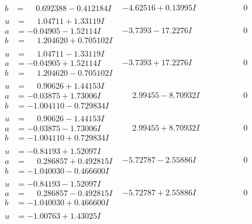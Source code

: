 \documentclass[1p]{elsarticle_modified}
\theoremstyle{definition}
\begin{document}
$$\begin{array}{c|c|c}
\begin{aligned}
b &= \phantom{-}0.692388 - 0.412184 I\end{aligned}
 & -4.62516 + 0.13995 I & \phantom{-0.000000 } 0 \\ \hline\begin{aligned}
u &= \phantom{-}1.04711 + 1.33119 I \\
a &= -0.04905 - 1.52114 I \\
b &= \phantom{-}1.204620 + 0.705102 I\end{aligned}
 & -3.7393 - 17.2276 I & \phantom{-0.000000 } 0 \\ \hline\begin{aligned}
u &= \phantom{-}1.04711 - 1.33119 I \\
a &= -0.04905 + 1.52114 I \\
b &= \phantom{-}1.204620 - 0.705102 I\end{aligned}
 & -3.7393 + 17.2276 I & \phantom{-0.000000 } 0 \\ \hline\begin{aligned}
u &= \phantom{-}0.90626 + 1.44153 I \\
a &= -0.03875 + 1.73006 I \\
b &= -1.004110 - 0.729834 I\end{aligned}
 & \phantom{-}2.99455 - 8.70932 I & \phantom{-0.000000 } 0 \\ \hline\begin{aligned}
u &= \phantom{-}0.90626 - 1.44153 I \\
a &= -0.03875 - 1.73006 I \\
b &= -1.004110 + 0.729834 I\end{aligned}
 & \phantom{-}2.99455 + 8.70932 I & \phantom{-0.000000 } 0 \\ \hline\begin{aligned}
u &= -0.84193 + 1.52097 I \\
a &= \phantom{-}0.286857 + 0.492815 I \\
b &= -1.040030 - 0.466600 I\end{aligned}
 & -5.72787 - 2.55886 I & \phantom{-0.000000 } 0 \\ \hline\begin{aligned}
u &= -0.84193 - 1.52097 I \\
a &= \phantom{-}0.286857 - 0.492815 I \\
b &= -1.040030 + 0.466600 I\end{aligned}
 & -5.72787 + 2.55886 I & \phantom{-0.000000 } 0 \\ \hline\begin{aligned}
u &= -1.00763 + 1.43025 I \\

\end{aligned}
\end{array}$$
\end{document}
